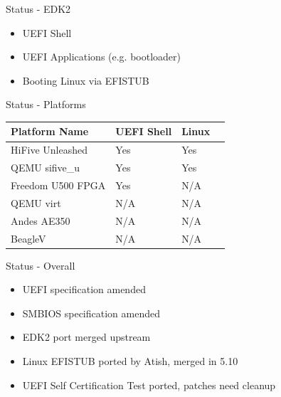 \documentclass[
  10pt
]{beamer}
\begin{document}
\begin{frame}{Status - EDK2}
  \begin{itemize}
    \item UEFI Shell
    \item UEFI Applications (e.g. bootloader)
    \item Booting Linux via EFISTUB
  \end{itemize}
\end{frame}

\begin{frame}{Status - Platforms}
  \begin{center}
    \begin{tabular}{|l|l|l|l|}
      \hline
      Platform Name     & UEFI Shell & Linux \\
      \hline
      HiFive Unleashed  & Yes        & Yes \\
      QEMU sifive\_u    & Yes        & Yes \\
      Freedom U500 FPGA & Yes        & N/A \\
      QEMU virt         & N/A        & N/A \\
      Andes AE350       & N/A        & N/A \\
      BeagleV           & N/A        & N/A \\
      \hline
    \end{tabular}
  \end{center}
\end{frame}

\begin{frame}{Status - Overall}
  \begin{itemize}
    \item UEFI specification amended
    \item SMBIOS specification amended
    \item EDK2 port merged upstream
    \item Linux EFISTUB ported by Atish, merged in 5.10
    \item UEFI Self Certification Test ported, patches need cleanup
  \end{itemize}
\end{frame}
\end{document}
